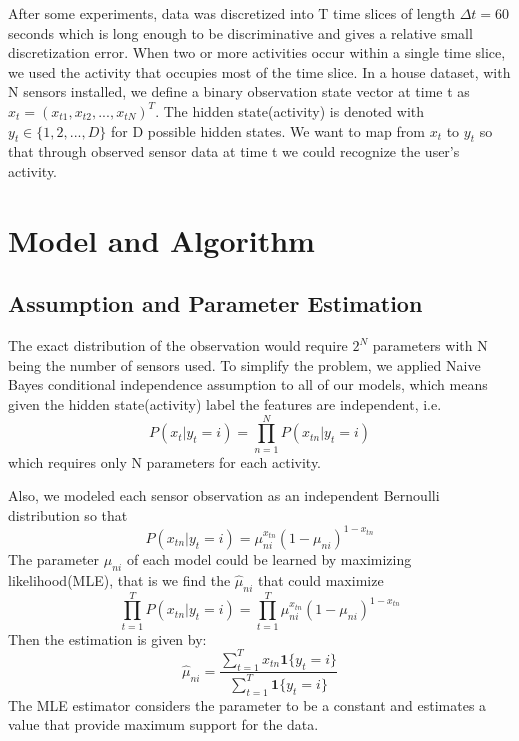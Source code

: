 \documentclass[10pt,letter]{article}
\numberwithin{equation}{section} %
\numberwithin{figure}{section} %
\numberwithin{table}{section} %
\begin{document}
After some experiments, data was discretized into T time slices of length $\Delta t =60$ seconds which is long enough to be discriminative and gives a relative small discretization error. When two or more activities occur within a single time slice, we used the activity that occupies most of the time slice.  In a house dataset, with N sensors installed, we define a binary observation state vector at time t as $x_{t} = (x_{t1}, x_{t2}, ... , x_{tN})^T$. The hidden state(activity) is denoted with $y_t \in \{1,2, ..., D\}$ for D possible hidden states. We want to map from $x_t$ to $y_t$ so that through observed sensor data at time t we could recognize the user's activity.
\section{Model and Algorithm}
\subsection{Assumption and Parameter Estimation}
The exact distribution of the observation would require $2^N$ parameters with N being the number of sensors used.  To simplify the problem, we applied Naive Bayes conditional independence assumption to all of our models, which means given the hidden state(activity) label the features are independent, i.e. 
$$P(x_t|y_t = i) = \prod_{n=1}^N P(x_{tn}|y_t=i)$$ which requires only N parameters for each activity.

Also, we modeled each sensor observation as an independent Bernoulli distribution so that 
$$P(x_{tn}|y_t = i) = \mu_{ni}^{x_{tn}}(1-\mu_{ni})^{1-x_{tn}}$$
The parameter $\mu_{ni}$ of each model could be learned  by maximizing likelihood(MLE), that is we find the $\hat{\mu}_{ni}$ that could maximize 
$$\prod_{t=1}^T P(x_{tn}|y_t = i) = \prod_{t=1}^T \mu_{ni}^{x_{tn}}(1-\mu_{ni})^{1-x_{tn}}$$
Then the estimation is given by:
$$\hat{\mu}_{ni} = \frac{\sum_{t=1}^T x_{tn}\mathbf{1}\{y_t=i\}}{\sum_{t=1}^T \mathbf{1}\{y_t=i\}}$$
The MLE estimator considers the parameter to be a constant and estimates a value that provide maximum support for the data.
\end{document}
